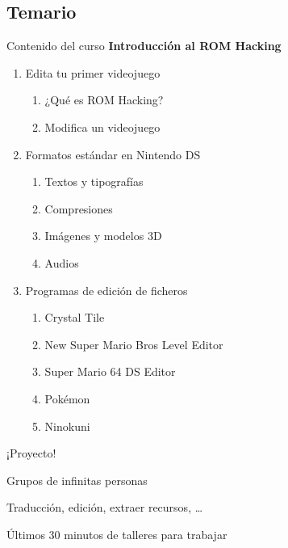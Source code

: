 \subsection{Temario}
\begin{frame}{Contenido del curso}
    \centering
    \textbf{Introducción al ROM Hacking}
    \begin{enumerate}
        \item<+-> Edita tu primer videojuego
        \begin{enumerate}
            \item ¿Qué es ROM Hacking?
            \item Modifica un videojuego
        \end{enumerate}
        \item<+-> Formatos estándar en Nintendo DS
        \begin{enumerate}
            \item Textos y tipografías
            \item Compresiones
            \item Imágenes y modelos 3D
            \item Audios
        \end{enumerate}
        \item<+-> Programas de edición de ficheros
        \begin{enumerate}
            \item Crystal Tile
            \item New Super Mario Bros Level Editor
            \item Super Mario 64 DS Editor
            \item Pokémon
            \item Ninokuni
        \end{enumerate}
    \end{enumerate}
\end{frame}

\begin{frame}{¡Proyecto!}
    \Large
    \begin{wideitemize}
        \item Grupos de infinitas personas
        \item Traducción, edición, extraer recursos, \ldots
        \item Últimos 30 minutos de talleres para trabajar
    \end{wideitemize}
\end{frame}


